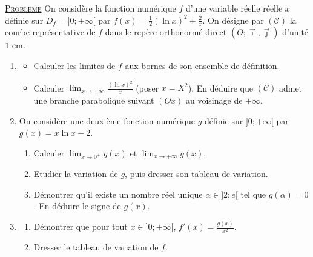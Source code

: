 \providecommand{\Df}{D_f}
\noindent \underline{\textsc{Probleme}} \newline
      On consid\`ere la fonction num\'erique $f$ d'une variable r\'eelle r\'eelle $x$ d\'efinie sur $\Df = ] 0 ; +\infty[$
      par $f(x) = \frac{1}{2} (\ln x)^2 + \frac{2}{x}$.
      On d\'esigne par $(\mathscr{C})$ la courbe repr\'esentative de $f$ dans le rep\`ere orthonorm\'e direct 
      $(O ; \vec{\imath} , \vec{\jmath} )$ d'unit\'e $1~\mathrm{cm}$.
      \begin{enumerate}
            \item \begin{itemize}
                        \item Calculer les limites de $f$ aux bornes de son ensemble de d\'efinition.
                        \item Calculer $\lim_{x\rightarrow+\infty} \frac{(\ln x)^2}{x}$ (poser $x = X^2$).
                              En d\'eduire que $(\mathscr{C})$ 
                              admet une branche parabolique suivant $(Ox)$ au voisinage de $+\infty$.
                  \end{itemize}
            \item On consid\`ere une deuxi\`eme fonction num\'erique $g$ d\'efinie sur $]0 ; +\infty[$ par $g(x) = x \ln x - 2$.
                  \begin{enumerate}
                        \item Calculer $\lim_{x\rightarrow 0^+ } g(x)$ et $\lim_{x\rightarrow +\infty} g(x)$.
                        \item Etudier la variation de $g$,
                              puis dresser son tableau de variation.
                        \item D\'emontrer qu'il existe un nombre r\'eel unique $\alpha \in ]2 ; e[$ tel que $g(\alpha) = 0$.
                              En d\'eduire le signe de $g(x)$. 
                  \end{enumerate}
            \item \begin{enumerate}
                        \item D\'emontrer que pour tout $x \in ] 0 ; +\infty [$, $f'(x) = \frac{g(x)}{x^2}$.
                        \item Dresser le tableau de variation de $f$.

\end{enumerate}
\end{enumerate}
